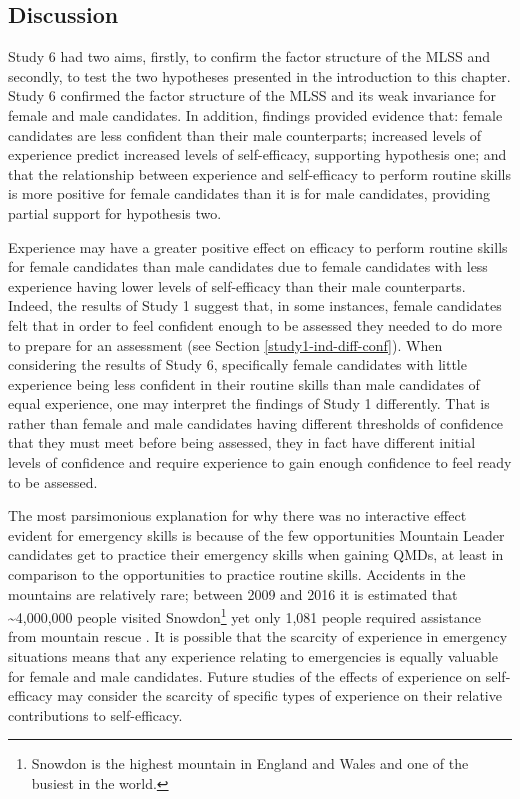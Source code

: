 \documentclass[
  12pt,
  a4paper,
]{book}
\begin{document}
\hypertarget{study-6-discussion}{%
\subsection{Discussion}\label{study-6-discussion}}

Study 6 had two aims, firstly, to confirm the factor structure of the MLSS and secondly, to test the two hypotheses presented in the introduction to this chapter. Study 6 confirmed the factor structure of the MLSS and its weak invariance for female and male candidates. In addition, findings provided evidence that: female candidates are less confident than their male counterparts; increased levels of experience predict increased levels of self-efficacy, supporting hypothesis one; and that the relationship between experience and self-efficacy to perform routine skills is more positive for female candidates than it is for male candidates, providing partial support for hypothesis two.

Experience may have a greater positive effect on efficacy to perform routine skills for female candidates than male candidates due to female candidates with less experience having lower levels of self-efficacy than their male counterparts. Indeed, the results of Study 1 suggest that, in some instances, female candidates felt that in order to feel confident enough to be assessed they needed to do more to prepare for an assessment (see Section \ref{study1-ind-diff-conf}). When considering the results of Study 6, specifically female candidates with little experience being less confident in their routine skills than male candidates of equal experience, one may interpret the findings of Study 1 differently. That is rather than female and male candidates having different thresholds of confidence that they must meet before being assessed, they in fact have different initial levels of confidence and require experience to gain enough confidence to feel ready to be assessed.

The most parsimonious explanation for why there was no interactive effect evident for emergency skills is because of the few opportunities Mountain Leader candidates get to practice their emergency skills when gaining QMDs, at least in comparison to the opportunities to practice routine skills. Accidents in the mountains are relatively rare; between 2009 and 2016 it is estimated that \textasciitilde4,000,000 people visited Snowdon\footnote{Snowdon is the highest mountain in England and Wales and one of the busiest in the world.} yet only 1,081 people required assistance from mountain rescue \citep[i.e., \textless{} 0.01\% of visitors;][]{SNPA2017}. It is possible that the scarcity of experience in emergency situations means that any experience relating to emergencies is equally valuable for female and male candidates. Future studies of the effects of experience on self-efficacy may consider the scarcity of specific types of experience on their relative contributions to self-efficacy.
\end{document}

